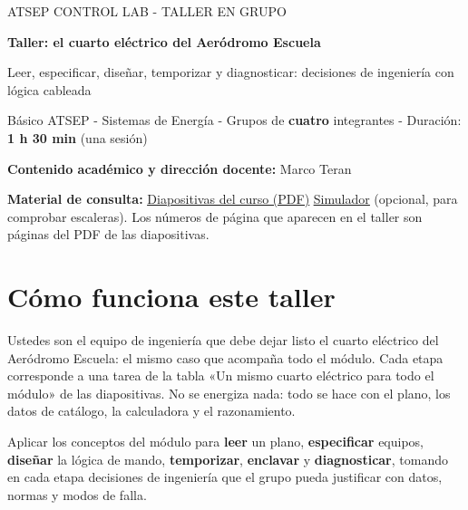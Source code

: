 \documentclass[11pt,a4paper]{article}
\newif\ifdocente
\begin{document}
\thispagestyle{empty}

{\color{azul}\ttfamily\small ATSEP CONTROL LAB - TALLER EN GRUPO\ifdocente\ \textcolor{rojo}{- VERSIÓN DOCENTE CON SOLUCIONES}\fi}\par\vspace{4pt}
{\LARGE\bfseries\color{navy} Taller: el cuarto eléctrico del Aeródromo Escuela\par}\vspace{4pt}
{\large\color{pizarra} Leer, especificar, diseñar, temporizar y diagnosticar: decisiones de ingeniería con lógica cableada\par}\vspace{6pt}
{\small Básico ATSEP - Sistemas de Energía - Grupos de \textbf{cuatro} integrantes - Duración: \textbf{1 h 30 min} (una sesión)\par
\textbf{Contenido académico y dirección docente:} Marco Teran}

\vspace{6pt}
\noindent\textbf{Material de consulta:}
\href{https://github.com/marcoteran/atsep-energy-control-labs/raw/refs/heads/master/presentaciones/marcoteran_energy_electriccontroland_wiredlogyc.pdf}{\textcolor{azul}{\underline{Diapositivas del curso (PDF)}}}
\quad
\href{https://atsep-controllogyc.vercel.app/}{\textcolor{azul}{\underline{Simulador}}} (opcional, para comprobar escaleras).
Los números de página que aparecen en el taller son páginas del PDF de las diapositivas.

\section*{Cómo funciona este taller}

Ustedes son el equipo de ingeniería que debe dejar listo el cuarto eléctrico del Aeródromo Escuela: el mismo caso que acompaña todo el módulo. Cada etapa corresponde a una tarea de la tabla «Un mismo cuarto eléctrico para todo el módulo» de las diapositivas. No se energiza nada: todo se hace con el plano, los datos de catálogo, la calculadora y el razonamiento.

\begin{objetivo}
Aplicar los conceptos del módulo para \textbf{leer} un plano, \textbf{especificar} equipos, \textbf{diseñar} la lógica de mando, \textbf{temporizar}, \textbf{enclavar} y \textbf{diagnosticar}, tomando en cada etapa decisiones de ingeniería que el grupo pueda justificar con datos, normas y modos de falla.
\end{objetivo}
\end{document}
